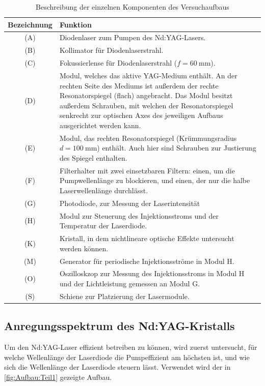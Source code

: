 \documentclass[../main.tex]{subfiles}
\begin{document}
        \begin{table}[H]
            \centering
            \begin{tabularx}{\textwidth}{cX}
                \textbf{Bezeichnung} & \textbf{Funktion}\\\hline\hline
                (A) & Diodenlaser zum Pumpen des Nd:YAG-Lasers.\\\hline
                (B) & Kollimator für Diodenlaserstrahl.\\\hline
                (C) & Fokussierlense für Diodenlaserstrahl ($f=\SI{60}{\milli\metre}$).\\\hline
                (D) & Modul, welches das aktive YAG-Medium enthält. An der rechten Seite des Mediums ist außerdem der rechte Resonatorspiegel (flach) angebracht. Das Modul besitzt außerdem Schrauben, mit welchen der Resonatorspiegel senkrecht zur optischen Axes des jeweiligen Aufbaus ausgerichtet werden kann. \\\hline
                (E) & Modul, das rechten Resonatorspiegel (Krümmungsradius $d=\SI{100}{\milli\metre}$) enthält. Auch hier sind Schrauben zur Justierung des Spiegel enthalten.\\\hline 
                (F) & Filterhalter mit zwei einsetzbaren Filtern: einen, um die Pumpwellenlänge zu blockieren, und einen, der nur die halbe Laserwellenlänge durchlässt.\\\hline
                (G) & Photodiode, zur Messung der Laserintensität\\\hline
                (H) & Modul zur Steuerung des Injektionsstroms und der Temperatur der Laserdiode.\\\hline
                (K) & Kristall, in dem nichtlineare optische Effekte untersucht werden können.\\\hline
                (M) & Generator für periodische Injektionsströme in Modul H.\\\hline
                (O) & Oszilloskzop zur Messung des Injektionsstroms in Modul H und der Lichtleistung gemessen an Modul G.\\\hline
                (S) & Schiene zur Platzierung der Lasermodule.\\\hline
            \end{tabularx}
            \caption{Beschreibung der einzelnen Komponenten des Versuchaufbaus}
            \label{tab:Aufbau:KomponentenErklaerung}
        \end{table}

    

    \subsection{Anregungsspektrum des Nd:YAG-Kristalls}
        Um den Nd:YAG-Laser effizient betreiben zu können, wird zuerst untersucht, für welche Wellenlänge der Laserdiode die Pumpeffizient am höchsten ist, und wie sich die Wellenlänge der Laserdiode steuern lässt. Verwendet wird der in \ref{fig:Aufbau:Teil1} gezeigte Aufbau.  
        
\end{document}
